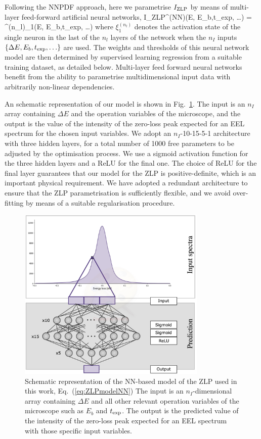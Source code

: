 Following the NNPDF approach, here we parametrise $I_{\rm ZLP}$ by means of
multi-layer feed-forward artificial neural networks,
\be
\label{eq:ZLPmodelNN}
I_{\rm ZLP}^{\rm (NN)}(\Delta E, E_{b},t_{\rm exp}, \ldots)  = \xi^{(n_l)}_1(\Delta E, E_{b},t_{\rm exp}, \ldots)
\ee
where $\xi^{(n_l)}_1$ denotes the activation state of the single neuron in the last
of the $n_l$ layers of the network when the $n_I$ inputs $\{ \Delta E, E_{b},t_{\rm exp}, \ldots \}$
are used.
%
The weights and thresholds of this neural network model are then determined
by supervised learning regression from a suitable training dataset, as
detailed below.
%
Multi-layer feed forward neural networks benefit from the ability
to parametrise multidimensional input data with arbitrarily
non-linear dependencies.

An schematic representation of our model
is shown in Fig.~\ref{fig:architecture}.
%
 The input is an $n_I$ array containing $\Delta E$ and the
 operation variables of the microscope, and
 the output is the value of the intensity of the zero-loss peak
 expected for an EEL spectrum for the chosen input variables.
 We adopt an $n_I$-10-15-5-1 architecture with three hidden layers, for a total
 number of 1000 free parameters to be adjusted by the optimisation process.
 We use a sigmoid activation function for the three hidden layers and a ReLU
 for the final one.
 The choice of ReLU for the final layer guarantees that our model for the ZLP
 is positive-definite, which is an important physical requirement.
 We have adopted a redundant architecture  to ensure that the ZLP parametrisation
 is sufficiently flexible, and we avoid over-fitting by means of
 a suitable regularisation procedure.
  
\begin{figure}[t]
    \centering
    \includegraphics[width=90mm]{plots/architecture.jpg}
    \caption{Schematic representation of the NN-based model of the ZLP used
      in this work, Eq.~(\ref{eq:ZLPmodelNN})
      The input is an $n_I$-dimensional array containing $\Delta E$ and all other relevant
      operation variables of the microscope such as $E_b$ and $t_{\rm exp}$.
      The output is the predicted value of the intensity of the zero-loss peak
      expected for an EEL spectrum with those specific input variables.
    }
    \label{fig:architecture}
\end{figure}

